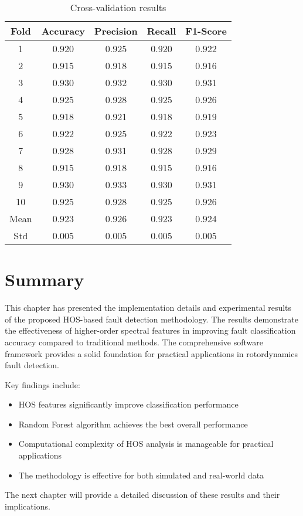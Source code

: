 \begin{table}[H]
\centering
\caption{Cross-validation results}
\label{tab:cross_validation}
\begin{tabular}{@{}ccccc@{}}
\toprule
Fold & Accuracy & Precision & Recall & F1-Score \\
\midrule
1 & 0.920 & 0.925 & 0.920 & 0.922 \\
2 & 0.915 & 0.918 & 0.915 & 0.916 \\
3 & 0.930 & 0.932 & 0.930 & 0.931 \\
4 & 0.925 & 0.928 & 0.925 & 0.926 \\
5 & 0.918 & 0.921 & 0.918 & 0.919 \\
6 & 0.922 & 0.925 & 0.922 & 0.923 \\
7 & 0.928 & 0.931 & 0.928 & 0.929 \\
8 & 0.915 & 0.918 & 0.915 & 0.916 \\
9 & 0.930 & 0.933 & 0.930 & 0.931 \\
10 & 0.925 & 0.928 & 0.925 & 0.926 \\
\midrule
Mean & 0.923 & 0.926 & 0.923 & 0.924 \\
Std & 0.005 & 0.005 & 0.005 & 0.005 \\
\bottomrule
\end{tabular}
\end{table}

\section{Summary}

This chapter has presented the implementation details and experimental results of the proposed HOS-based fault detection methodology. The results demonstrate the effectiveness of higher-order spectral features in improving fault classification accuracy compared to traditional methods. The comprehensive software framework provides a solid foundation for practical applications in rotordynamics fault detection.

Key findings include:
\begin{itemize}
    \item HOS features significantly improve classification performance
    \item Random Forest algorithm achieves the best overall performance
    \item Computational complexity of HOS analysis is manageable for practical applications
    \item The methodology is effective for both simulated and real-world data
\end{itemize}

The next chapter will provide a detailed discussion of these results and their implications.
